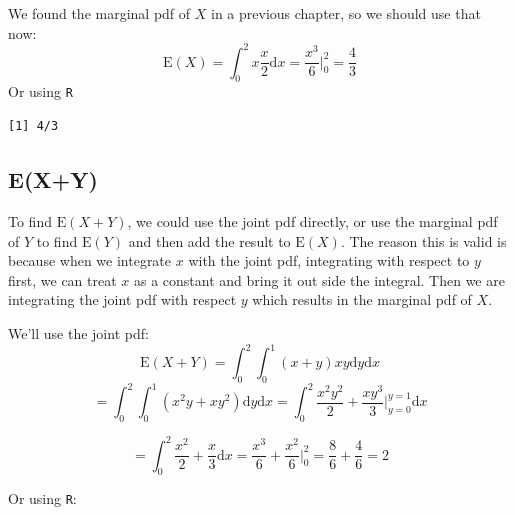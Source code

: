 \documentclass[
  letterpaper,
  DIV=11,
  numbers=noendperiod]{scrreprt}
\newenvironment{Shaded}{\begin{snugshade}}{\end{snugshade}}
\newcommand{\AttributeTok}[1]{\textcolor[rgb]{0.40,0.45,0.13}{#1}}
\newcommand{\ControlFlowTok}[1]{\textcolor[rgb]{0.00,0.23,0.31}{#1}}
\newcommand{\DecValTok}[1]{\textcolor[rgb]{0.68,0.00,0.00}{#1}}
\newcommand{\FunctionTok}[1]{\textcolor[rgb]{0.28,0.35,0.67}{#1}}
\newcommand{\NormalTok}[1]{\textcolor[rgb]{0.00,0.23,0.31}{#1}}
\newcommand{\SpecialCharTok}[1]{\textcolor[rgb]{0.37,0.37,0.37}{#1}}
\begin{document}
We found the marginal pdf of \(X\) in a previous chapter, so we should
use that now: \[
\mbox{E}(X)=\int_0^2 x\frac{x}{2}\mbox{d} x = \frac{x^3}{6}\bigg|_0^2= \frac{4}{3} 
\] Or using \texttt{R}

\begin{Shaded}
\end{Shaded}

\begin{verbatim}
[1] 4/3
\end{verbatim}

\subsection{E(X+Y)}\label{exy-2}

To find \(\mbox{E}(X+Y)\), we could use the joint pdf directly, or use
the marginal pdf of \(Y\) to find \(\mbox{E}(Y)\) and then add the
result to \(\mbox{E}(X)\). The reason this is valid is because when we
integrate \(x\) with the joint pdf, integrating with respect to \(y\)
first, we can treat \(x\) as a constant and bring it out side the
integral. Then we are integrating the joint pdf with respect \(y\) which
results in the marginal pdf of \(X\).

We'll use the joint pdf: \[
\mbox{E}(X+Y)=\int_0^2\int_0^1 (x+y)xy\mbox{d} y \mbox{d} x
\] \[
=\int_0^2\int_0^1 (x^2y+xy^2)\mbox{d} y \mbox{d} x = \int_0^2 \frac{x^2y^2}{2}+\frac{xy^3}{3} \bigg|_{y=0}^{y=1}\mbox{d} x
\]

\[
= \int_0^2 \frac{x^2}{2}+\frac{x}{3} \mbox{d} x= \frac{x^3}{6}+\frac{x^2}{6}\bigg|_0^2=\frac{8}{6}+\frac{4}{6}=2
\]

Or using \texttt{R}:

\begin{Shaded}
\end{Shaded}
\end{document}
